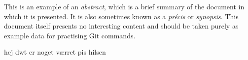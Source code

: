 This is an example of an \emph{abstract}, which is a brief summary of the document in which it is presented.
It is also sometimes known as a \emph{précis} or \emph{synopsis}.
This document itself presents no interesting content and should be taken purely as example data for practising Git commands.



hej dwt er noget værret pis hilsen 
